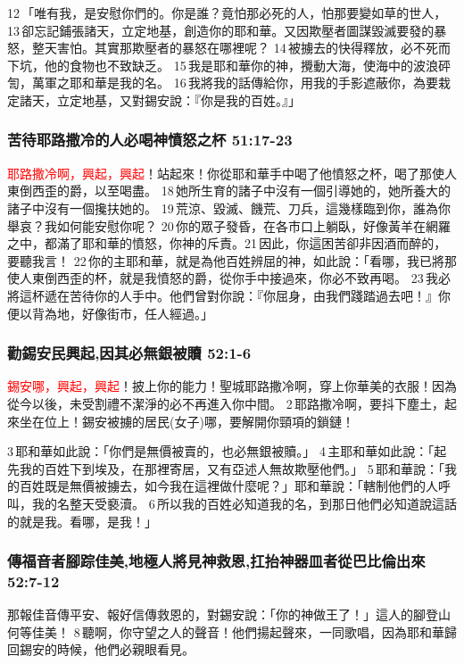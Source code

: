 12 「唯有我，是安慰你們的。你是誰？竟怕那必死的人，怕那要變如草的世人， 13 卻忘記鋪張諸天，立定地基，創造你的耶和華。又因欺壓者圖謀毀滅要發的暴怒，整天害怕。其實那欺壓者的暴怒在哪裡呢？ 14 被擄去的快得釋放，必不死而下坑，他的食物也不致缺乏。 15 我是耶和華你的神，攪動大海，使海中的波浪砰訇，萬軍之耶和華是我的名。 16 我將我的話傳給你，用我的手影遮蔽你，為要栽定諸天，立定地基，又對錫安說：『你是我的百姓。』」


\subsubsection{苦待耶路撒冷的人必喝神憤怒之杯 51:17-23}
\textcolor{red}{耶路撒冷啊，興起，興起}！站起來！你從耶和華手中喝了他憤怒之杯，喝了那使人東倒西歪的爵，以至喝盡。 18 她所生育的諸子中沒有一個引導她的，她所養大的諸子中沒有一個攙扶她的。 19 荒涼、毀滅、饑荒、刀兵，這幾樣臨到你，誰為你舉哀？我如何能安慰你呢？ 20 你的眾子發昏，在各市口上躺臥，好像黃羊在網羅之中，都滿了耶和華的憤怒，你神的斥責。21 因此，你這困苦卻非因酒而醉的，要聽我言！ 22 你的主耶和華，就是為他百姓辨屈的神，如此說：「看哪，我已將那使人東倒西歪的杯，就是我憤怒的爵，從你手中接過來，你必不致再喝。 23 我必將這杯遞在苦待你的人手中。他們曾對你說：『你屈身，由我們踐踏過去吧！』你便以背為地，好像街市，任人經過。」

\subsubsection{勸錫安民興起,因其必無銀被贖 52:1-6}
\textcolor{red}{錫安哪，興起，興起}！披上你的能力！聖城耶路撒冷啊，穿上你華美的衣服！因為從今以後，未受割禮不潔淨的必不再進入你中間。 2 耶路撒冷啊，要抖下塵土，起來坐在位上！錫安被擄的居民(女子)哪，要解開你頸項的鎖鏈！

3 耶和華如此說：「你們是無價被賣的，也必無銀被贖。」 4 主耶和華如此說：「起先我的百姓下到埃及，在那裡寄居，又有亞述人無故欺壓他們。」 5 耶和華說：「我的百姓既是無價被擄去，如今我在這裡做什麼呢？」耶和華說：「轄制他們的人呼叫，我的名整天受褻瀆。 6 所以我的百姓必知道我的名，到那日他們必知道說這話的就是我。看哪，是我！」

\subsubsection{傳福音者腳踪佳美,地極人將見神救恩,扛抬神器皿者從巴比倫出來 52:7-12}
那報佳音傳平安、報好信傳救恩的，對錫安說：「你的神做王了！」這人的腳登山何等佳美！ 8 聽啊，你守望之人的聲音！他們揚起聲來，一同歌唱，因為耶和華歸回錫安的時候，他們必親眼看見。

